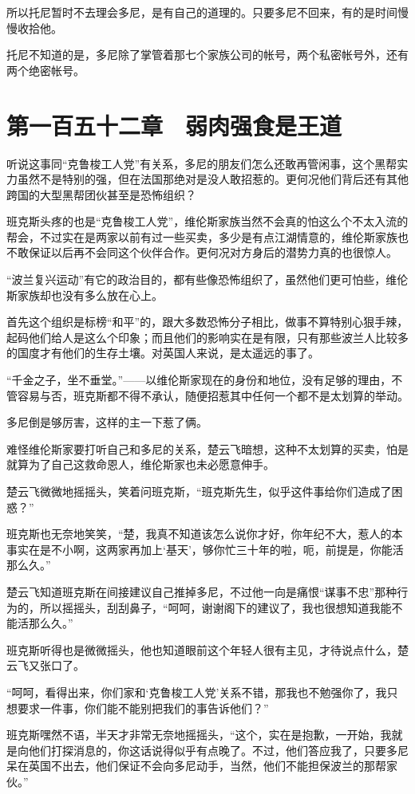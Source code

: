 所以托尼暂时不去理会多尼，是有自己的道理的。只要多尼不回来，有的是时间慢慢收拾他。

托尼不知道的是，多尼除了掌管着那七个家族公司的帐号，两个私密帐号外，还有两个绝密帐号。

\section{第一百五十二章　弱肉强食是王道}

听说这事同“克鲁梭工人党”有关系，多尼的朋友们怎么还敢再管闲事，这个黑帮实力虽然不是特别的强，但在法国那绝对是没人敢招惹的。更何况他们背后还有其他跨国的大型黑帮团伙甚至是恐怖组织？

班克斯头疼的也是“克鲁梭工人党”，维伦斯家族当然不会真的怕这么个不太入流的帮会，不过实在是两家以前有过一些买卖，多少是有点江湖情意的，维伦斯家族也不敢保证以后再不会同这个伙伴合作。更何况对方身后的潜势力真的也很惊人。

“波兰复兴运动”有它的政治目的，都有些像恐怖组织了，虽然他们更可怕些，维伦斯家族却也没有多么放在心上。

首先这个组织是标榜“和平”的，跟大多数恐怖分子相比，做事不算特别心狠手辣，起码他们给人是这么个印象；而且他们的影响实在是有限，只有那些波兰人比较多的国度才有他们的生存土壤。对英国人来说，是太遥远的事了。

“千金之子，坐不垂堂。”——以维伦斯家现在的身份和地位，没有足够的理由，不管容易与否，班克斯都不得不承认，随便招惹其中任何一个都不是太划算的举动。

多尼倒是够厉害，这样的主一下惹了俩。

难怪维伦斯家要打听自己和多尼的关系，楚云飞暗想，这种不太划算的买卖，怕是就算为了自己这救命恩人，维伦斯家也未必愿意伸手。

楚云飞微微地摇摇头，笑着问班克斯，“班克斯先生，似乎这件事给你们造成了困惑？”

班克斯也无奈地笑笑，“楚，我真不知道该怎么说你才好，你年纪不大，惹人的本事实在是不小啊，这两家再加上‘基天’，够你忙三十年的啦，呃，前提是，你能活那么久。”

楚云飞知道班克斯在间接建议自己推掉多尼，不过他一向是痛恨“谋事不忠”那种行为的，所以摇摇头，刮刮鼻子，“呵呵，谢谢阁下的建议了，我也很想知道我能不能活那么久。”

班克斯听得也是微微摇头，他也知道眼前这个年轻人很有主见，才待说点什么，楚云飞又张口了。

“呵呵，看得出来，你们家和‘克鲁梭工人党’关系不错，那我也不勉强你了，我只想要求一件事，你们能不能别把我们的事告诉他们？”

班克斯嘿然不语，半天才非常无奈地摇摇头，“这个，实在是抱歉，一开始，我就是向他们打探消息的，你这话说得似乎有点晚了。不过，他们答应我了，只要多尼呆在英国不出去，他们保证不会向多尼动手，当然，他们不能担保波兰的那帮家伙。”

